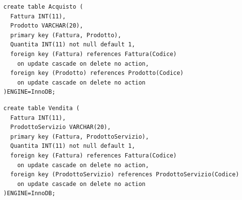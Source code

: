 \begin{verbatim}
create table Acquisto (
  Fattura INT(11),
  Prodotto VARCHAR(20),
  primary key (Fattura, Prodotto),
  Quantita INT(11) not null default 1,
  foreign key (Fattura) references Fattura(Codice)
    on update cascade on delete no action,
  foreign key (Prodotto) references Prodotto(Codice)
    on update cascade on delete no action
)ENGINE=InnoDB;
\end{verbatim}
\vspace{0.5cm}

\noindent{}
\newline\newline

\begin{verbatim}
create table Vendita (
  Fattura INT(11),
  ProdottoServizio VARCHAR(20),
  primary key (Fattura, ProdottoServizio),
  Quantita INT(11) not null default 1,
  foreign key (Fattura) references Fattura(Codice)
    on update cascade on delete no action,
  foreign key (ProdottoServizio) references ProdottoServizio(Codice)
    on update cascade on delete no action
)ENGINE=InnoDB;
\end{verbatim}
\vspace{0.5cm}

\noindent{}
\newline\newline
